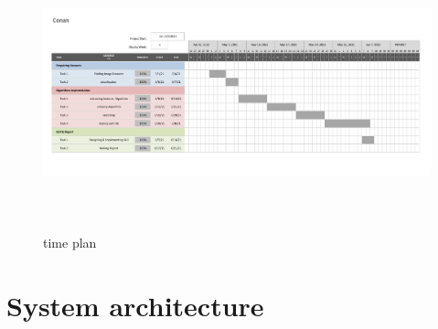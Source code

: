 \documentclass[pdftex,10pt,a4paper,oneside]{article}
\begin{document}
	
	\begin{figure}[H]
		\centering
		\includegraphics[width=140mm,height=80mm]{fig/5.png}
		\caption{time plan }
		\label{time plan}
	\end{figure}
	\pagebreak
	\section{System architecture}
	



\pagebreak
\end{document}
